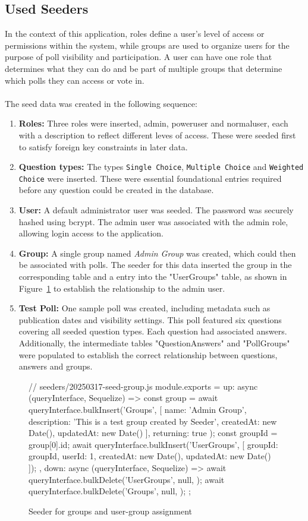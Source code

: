 \documentclass[a4paper,12pt]{report}
\begin{document}
\subsection{Used Seeders}
In the context of this application, roles define a user's level of access or permissions within the system, while groups are used to organize users for the purpose of poll visibility and participation. A user can have one role that determines what they can do and be part of multiple groups that determine which polls they can access or vote in. \\\\
The seed data was created in the following sequence:
\begin{enumerate}
	\item \textbf{Roles:} Three roles were inserted, admin, poweruser and normaluser, each with a description to reflect different leves of access. These were seeded first to satisfy foreign key constraints in later data.
	\item \textbf{Question types:} The types \texttt{Single Choice}, \texttt{Multiple Choice} and \texttt{Weighted Choice} were inserted. These were essential foundational entries required before any question could be created in the database. 
	\item \textbf{User:} A default administrator user was seeded. The password was securely hashed using bcrypt. The admin user was associated with the admin role, allowing login access to the application.
	\item \textbf{Group:} A single group named \textit{Admin Group} was created, which could then be associated with polls. The seeder for this data inserted the group in the corresponding table and a entry into the "UserGroups" table, as shown in Figure~\ref{fig:group_seeder} to establish the relationship to the admin user.
	\item \textbf{Test Poll:} One sample poll was created, including metadata such as publication dates and visibility settings. This poll featured six questions covering all seeded question types. Each question had associated answers. Additionally, the intermediate tables "QuestionAnswers" and "PollGroups" were populated to establish the correct relationship between questions, answers and groups.
\end{enumerate}
\begin{figure}[H]
	\begin{code}
	// seeders/20250317-seed-group.js
	module.exports = {
	up: async (queryInterface, Sequelize) => {
		const group = await queryInterface.bulkInsert('Groups', [{
		name: 'Admin Group',
		description: 'This is a test group created by Seeder',
		createdAt: new Date(),
		updatedAt: new Date()
		}], { returning: true });
		const groupId = group[0].id;
		await queryInterface.bulkInsert('UserGroups', [{
		groupId: groupId,
		userId: 1,
		createdAt: new Date(),
		updatedAt: new Date()
		}]);
	},
	down: async (queryInterface, Sequelize) => {
		await queryInterface.bulkDelete('UserGroups', null, {});
		await queryInterface.bulkDelete('Groups', null, {});
	}
	};
	\end{code}
\caption{Seeder for groups and user-group assignment}
\label{fig:group_seeder}
\end{figure}
\end{document}
